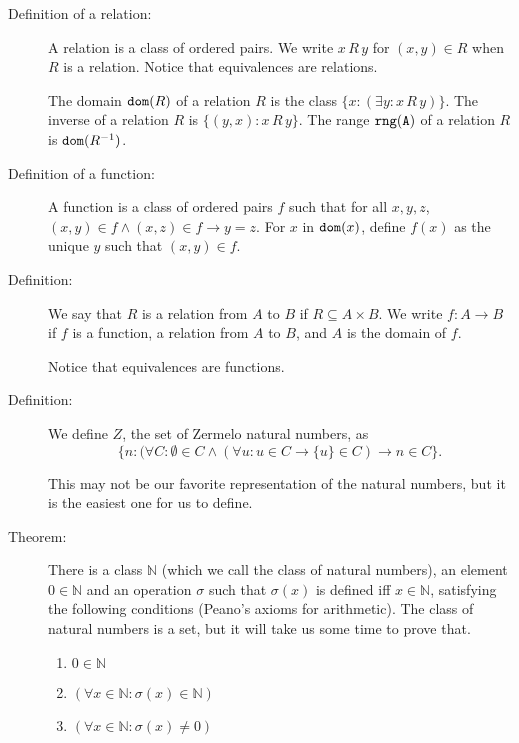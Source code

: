\documentclass[12pt]{article}
\begin{document}
\begin{description}

\item[Definition of a relation:]  A relation is a class of ordered pairs.  We write $x\, R \, y$ for $(x,y) \in R$ when $R$ is a relation.  Notice that equivalences are relations.

The domain ${\tt dom}(R)$ of a relation $R$ is the class $\{x:(\exists y:x \, R \, y)\}$.   The inverse of a relation $R$ is $\{(y,x):x \, R \, y\}$.  The range ${\tt rng(A)}$ of a relation $R$ is ${\tt dom}(R^{-1})$.

\item[Definition of a function:]  A function is a class of ordered pairs $f$ such that for all $x,y,z$, $(x,y) \in f \wedge (x,z) \in f \rightarrow y=z$.  For $x$ in ${\tt dom}(x)$, define $f(x)$ as the unique $y$ such that $(x,y) \in f$.

\item[Definition:]  We say that $R$ is a relation from $A$ to $B$ if $R \subseteq A \times B$.  We write $f:A \rightarrow B$ if $f$ is a function, a relation from $A$ to $B$, and $A$ is the domain of $f$.

Notice that equivalences are functions.

\item[Definition:]  We define $Z$, the set of Zermelo natural numbers, as $$\{n:(\forall C:\emptyset \in C \wedge (\forall u:u \in C \rightarrow \{u\} \in C) \rightarrow n \in C\}.$$

This may not be our favorite representation of the natural numbers, but it is the easiest one for us to define.

\item[Theorem:]  There is a class $\mathbb N$ (which we call the class of natural numbers), an element $0 \in \mathbb N$ and an operation $\sigma$ such that $\sigma(x)$ is defined iff $x \in \mathbb N$, satisfying the following conditions (Peano's axioms for arithmetic).  The class of natural numbers is a set, but it will take us some time to prove that.

\begin{enumerate}

\item $0 \in \mathbb N$

\item $(\forall x \in \mathbb N:\sigma(x) \in \mathbb N)$

\item $(\forall x \in \mathbb N:\sigma(x) \neq 0)$


\end{enumerate}
\end{description}
\end{document}
